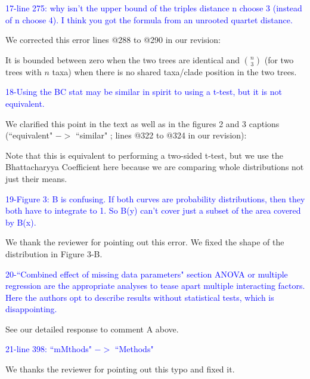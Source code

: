 \documentclass[11pt]{letter}
\begin{document}
\begin{letter}{}

\textcolor{blue}{17-line 275: why isn't the upper bound of the triples distance n choose 3 (instead of n choose 4). I think you got the formula from an unrooted quartet distance.}

We corrected this error lines @288 to @290 in our revision:

\hfill\begin{minipage}{\dimexpr\textwidth-1cm}
It is bounded between zero when the two trees are identical and $\binom{n}{3}$ (for two trees with $n$ taxa) when there is no shared taxa/clade position in the two trees.
\end{minipage}


\textcolor{blue}{18-Using the BC stat may be similar in spirit to using a t-test, but it is not equivalent.}

We clarified this point in the text as well as in the figures 2 and 3 captions (``equivalent" $->$ ``similar" ; lines @322 to @324 in our revision):

\hfill\begin{minipage}{\dimexpr\textwidth-1cm}
Note that this is equivalent to performing a two-sided t-test, but we use the Bhattacharyya Coefficient here because we are comparing whole distributions not just their means.
\end{minipage}


\textcolor{blue}{19-Figure 3: B is confusing. If both curves are probability distributions, then they both have to integrate to 1. So B(y) can't cover just a subset of the area covered by B(x).}

We thank the reviewer for pointing out this error. We fixed the shape of the distribution in Figure 3-B.


\textcolor{blue}{20-``Combined effect of missing data parameters" section ANOVA or multiple regression are the appropriate analyses to tease apart multiple interacting factors. Here the authors opt to describe results without statistical tests, which is disappointing.}

See our detailed response to comment A above.


\textcolor{blue}{21-line 398: ``mMthods" $->$ ``Methods"}

We thanks the reviewer for pointing out this typo and fixed it.


\end{letter}
\end{document}
